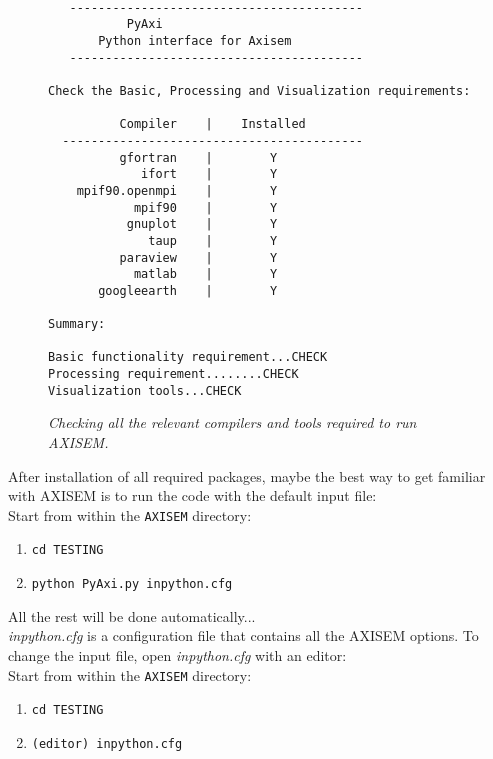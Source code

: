 \begin{figure*}[htb]
\begin{center}
\begin{verbatim}
 
   -----------------------------------------
		   PyAxi
	   Python interface for Axisem
   -----------------------------------------

Check the Basic, Processing and Visualization requirements:

          Compiler    |    Installed
  ------------------------------------------
          gfortran    |        Y
             ifort    |        Y
    mpif90.openmpi    |        Y
            mpif90    |        Y
           gnuplot    |        Y
              taup    |        Y
          paraview    |        Y
            matlab    |        Y
       googleearth    |        Y

Summary:

Basic functionality requirement...CHECK
Processing requirement........CHECK
Visualization tools...CHECK
\end{verbatim}
\end{center}
\caption{\textit{Checking all the relevant compilers and tools required to run AXISEM.}}
\label{check_pyaxi}
\end{figure*}


\noindent After installation of all required packages, 
maybe the best way to get familiar with AXISEM is to run the code with the default input file:\\

Start from within the {\tt AXISEM} directory:
\begin{enumerate}
\itemsep0em
\item {\tt cd TESTING}
\item {\tt python PyAxi.py inpython.cfg}
\end{enumerate}

All the rest will be done automatically...\\

\noindent \textit{inpython.cfg} is a configuration file that contains all the AXISEM options.
To change the input file, open \textit{inpython.cfg} with an editor:\\

Start from within the {\tt AXISEM} directory:
\begin{enumerate}
\itemsep0em
\item {\tt cd TESTING}
\item {\tt (editor) inpython.cfg}
\end{enumerate}


